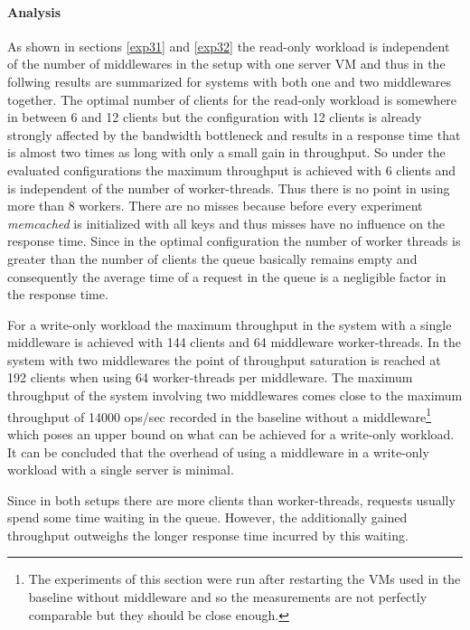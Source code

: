 \documentclass[11pt,a4paper]{article}
\begin{document}

\paragraph{Analysis}

As shown in sections \ref{exp31} and \ref{exp32} the read-only workload is independent of the number of middlewares in the setup with one server VM and thus in the follwing results are summarized for systems with both one and two middlewares together.
The optimal number of clients for the read-only workload is somewhere in between 6 and 12 clients but the configuration with 12 clients is already strongly affected by the bandwidth bottleneck and results in a response time that is almost two times as long with only a small gain in throughput. So under the evaluated configurations the maximum throughput is achieved with 6 clients and is independent of the number of worker-threads. Thus there is no point in using more than 8 workers. 
There are no misses because before every experiment \emph{memcached} is initialized with all keys and thus misses have no influence on the response time. Since in the optimal configuration the number of worker threads is greater than the number of clients the queue basically remains empty and consequently the average time of a request in the queue is a negligible factor in the response time.

For a write-only workload the maximum throughput  in the system with a single middleware is achieved with 144 clients and 64 middleware worker-threads. In the system with two middlewares the point of throughput saturation is reached at 192 clients when using 64 worker-threads per middleware. The maximum throughput of the system involving two middlewares comes close to the maximum throughput of 14000 ops/sec recorded in the baseline without a middleware\footnote{The experiments of this section were run after restarting the VMs used in the baseline without middleware and so the measurements are not perfectly comparable but they should be close enough.} which poses an upper bound on what can be achieved for a write-only workload. It can be concluded that the overhead of using a middleware in a write-only workload with a single server is minimal.

Since in both setups there are more clients than worker-threads, requests usually spend some time waiting in the queue. However, the additionally gained throughput outweighs the longer response time incurred by this waiting.
\end{document}
